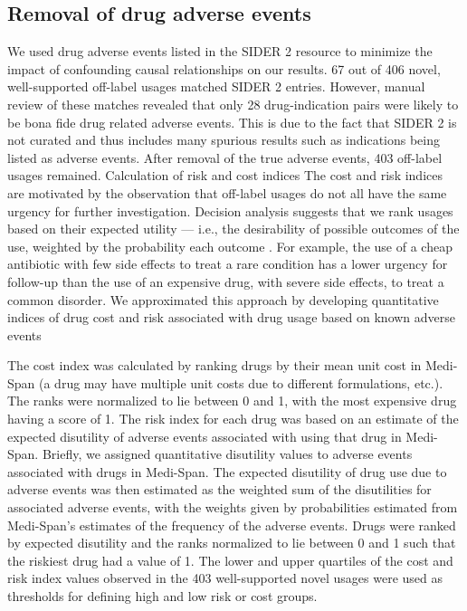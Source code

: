\subsection{Removal of drug adverse events}
We used drug adverse events listed in the SIDER 2 resource to minimize
the impact of confounding causal relationships on our results.  67 out
of 406 novel, well-supported off-label usages matched SIDER 2 entries.
However, manual review of these matches revealed that only 28
drug-indication pairs were likely to be bona fide drug related adverse
events.  This is due to the fact that SIDER 2 is not curated and thus
includes many spurious results such as indications being listed as
adverse events.  After removal of the true adverse events, 403
off-label usages remained.  Calculation of risk and cost indices The
cost and risk indices are motivated by the observation that off-label
usages do not all have the same urgency for further investigation.
Decision analysis suggests that we rank usages based on their expected
utility — i.e., the desirability of possible outcomes of the use,
weighted by the probability each outcome \cite{Meltzer2011}.  For
example, the use of a cheap antibiotic with few side effects to treat
a rare condition has a lower urgency for follow-up than the use of an
expensive drug, with severe side effects, to treat a common disorder.
We approximated this approach by developing quantitative indices of
drug cost and risk associated with drug usage based on known adverse
events

The cost index was calculated by ranking drugs by their mean unit cost
in Medi-Span (a drug may have multiple unit costs due to different
formulations, etc.).  The ranks were normalized to lie between 0 and
1, with the most expensive drug having a score of 1.  The risk index
for each drug was based on an estimate of the expected disutility of
adverse events associated with using that drug in Medi-Span. Briefly,
we assigned quantitative disutility values to adverse events
associated with drugs in Medi-Span.  The expected disutility of drug
use due to adverse events was then estimated as the weighted sum of
the disutilities for associated adverse events, with the weights given
by probabilities estimated from Medi-Span’s estimates of the frequency
of the adverse events.  Drugs were ranked by expected disutility and
the ranks normalized to lie between 0 and 1 such that the riskiest
drug had a value of 1. The lower and upper quartiles of the cost and
risk index values observed in the 403 well-supported novel usages were
used as thresholds for defining high and low risk or cost groups.

